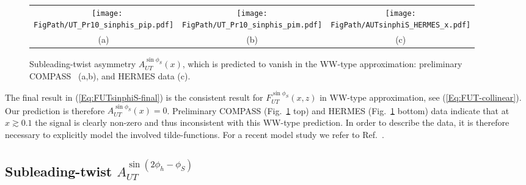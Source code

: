 \documentclass[a4paper,11pt]{article}
\newcommand{\blue}[1]{{\color{blue} #1}}
\newcommand{\la}{\langle}
\newcommand{\ra}{\rangle}
\newcommand{\ps}[1]{\blue{#1}}
\def\kperp{k_\perp}
\newcommand*{\FigPath}{./figs}%
\begin{document}
\begin{figure}
\centering
\begin{tabular}{ccc} \ \hspace{-8mm}
\texttt{[image: \\FigPath/UT\_Pr10\_sinphis\_pip.pdf]}&
\texttt{[image: \\FigPath/UT\_Pr10\_sinphis\_pim.pdf]}&
\texttt{[image: \\FigPath/AUTsinphiS\_HERMES\_x.pdf]}\\
{\tiny (a)}&{\tiny (b)}&{\tiny (c)}
\end{tabular}
\caption{\label{autsinphis}
 	Subleading-twist asymmetry $A_{UT}^{\sin\phi_S}(x)$, which
	is predicted to vanish in the WW-type approximation: 
	preliminary COMPASS~\cite{Parsamyan:2013fia} (a,b), 
	and HERMES data \cite{Schnell:2010zza} (c).}
\end{figure}


The final result in (\ref{Eq:FUTsinphiS-final}) is the consistent
result for $F_{UT}^{\sin\phi_S}(x,z)$ in WW-type
approximation, see (\ref{Eq:FUT-collinear}). Our prediction is
therefore $A_{UT}^{\sin\phi_S}(x)=0$. Preliminary
COMPASS \cite{Parsamyan:2013fia} (Fig.~\ref{autsinphis} top) and
HERMES \cite{Schnell:2010zza} (Fig.~\ref{autsinphis} bottom) data
indicate that at $x\gtrsim 0.1$ the signal is clearly non-zero and
thus inconsistent with this WW-type prediction. In order to
describe the data, it is therefore necessary to explicitly model
the involved tilde-functions. For a recent model study we refer
to Ref.~\cite{Mao:2014aoa}.




\newpage
\subsection{\boldmath Subleading-twist  $A_{UT}^{\sin(2\phi_h-\phi_S)}$ }
\label{Sec-7.8:FUTsin2phi-phiS}


\end{document}
